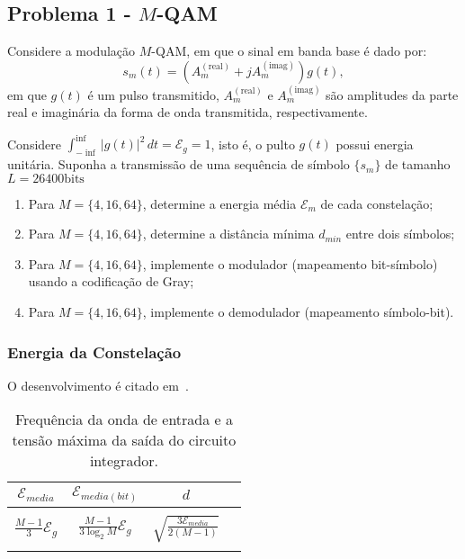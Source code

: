 \subsection{Problema 1 - \texorpdfstring{$M$}{M}-QAM}

Considere a modulação $M$-QAM, em que o sinal em banda base é dado por:
$$s_m(t) = ( A_m^{(\text{real})} + j A_m^{(\text{imag})}) g(t) ,$$
em que $g(t)$ é um pulso transmitido, $A_m^{(\text{real})}$ e $A_m^{(\text{imag})}$ são amplitudes da parte real e imaginária da forma de onda transmitida, respectivamente.

Considere $\int_{-\inf}^{\inf} |g(t)|^2 \,dt = \mathcal{E}_{g} = 1$, isto é, o pulto $g(t)$ possui energia unitária. Suponha a transmissão de uma sequência de símbolo $\{s_{m}\}$ de tamanho $L = 26400 \text{bits}$
\begin{enumerate}
    \item Para $M = \{ 4, 16, 64\}$, determine a energia média $\mathcal{E}_{m}$ de cada constelação;
    \item Para $M = \{ 4, 16, 64\}$, determine a distância mínima $d_{min}$ entre dois símbolos;
    \item Para $M = \{ 4, 16, 64\}$, implemente o modulador (mapeamento bit-símbolo) usando a codificação de Gray;
    \item Para $M = \{ 4, 16, 64\}$, implemente o demodulador (mapeamento símbolo-bit).
\end{enumerate}


\subsubsection{Energia da Constelação} 

O desenvolvimento é citado em~\cite{Proakis, Cecilio}.

\begin{table}[!ht]
    \centering
    \begin{tabular}{|c|c|c|c|}
    \hline
    $\mathcal{E}_{media}$ & $\mathcal{E}_{media(bit)}$ & $d$ \\ \hline
     &  &  \\ 
     $\frac{M-1}{3} \mathcal{E}_g$ & $ \frac{M-1}{3\log_2 M} \mathcal{E}_g$ & $\sqrt{\frac{3 \mathcal{E}_{media}}{2(M-1)}} $ \\ 
     &  &  \\ \hline
    \end{tabular}
    \caption{Frequência da onda de entrada e a tensão máxima da saída do circuito integrador.}
    \label{tab:QAM}
\end{table}

